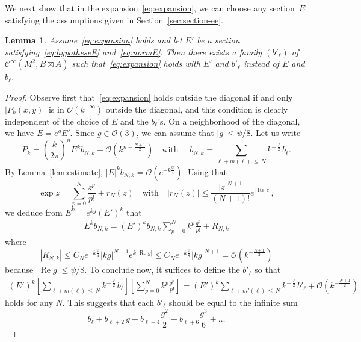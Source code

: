 \documentclass[10pt,a4paper]{article}
\newtheorem{lemm}[theo]{Lemma}
\theoremstyle{definition}
\numberwithin{equation}{section}
\newcommand{\con}{\overline}
\newcommand{\op}{\operatorname}
\newcommand{\Ci}{{\mathcal{C}}^{\infty}}
\newcommand{\bigo}{\mathcal{O}}
\begin{document}
We next show that in the expansion~\eqref{eq:expansion}, we can choose any section~$E$ satisfying the assumptions given in Section~\ref{sec:section-ee}.

\begin{lemm}\label{lem:changement_E}
Assume~\eqref{eq:expansion} holds and let $E'$ be a section satisfying~\eqref{eq:hypotheseE} and~\eqref{eq:normE}. Then there exists a family $(b'_{\ell})$ of $\Ci (M^2, B \boxtimes \con A)$ such that~\eqref{eq:expansion} holds with $E'$ and $b'_{\ell}$ instead of $E$ and $b_{\ell}$.
\end{lemm}

\begin{proof}
Observe first that~\eqref{eq:expansion} holds outside the diagonal if and only $|P_k (x,y)|$ is in $\bigo (k^{-\infty})$ outside the diagonal, and this condition is clearly independent of the choice of $E$ and the $b_{\ell}$'s. On a neighborhood of the diagonal, we have $E = e^{g} E'$. Since $g \in \bigo (3)$, we can assume that  $|g| \leqslant \psi/8$.  Let us write
\[
P_k = \left(\frac{k}{2 \pi}\right)^n E^k
b_{N,k} + \bigo \left(k^{n- \frac{N+1}{2}}\right) \quad \text{with } \quad b_{N,k} = \sum_{\ell + m (\ell)
\,\leqslant\,N} k^{-\frac{\ell}{2}}b_{\ell}.
\]
By Lemma~\ref{lem:estimate},  $|E|^k b_{N,k} = \bigo (e^{-k \frac{\psi}{4}})$.  Using that
\[
\exp z = \sum_{p = 0 }^N \frac{z^p }{p!} + r_N (z) \quad \text{with} \quad |r_{N} (z) | \leqslant \frac{|z|^{N+1} }{ (N+1)!} e^{|\op{Re} z |},
\]
we deduce from $E^k = e^{kg } (E')^k$ that
\begin{gather}\label{eq:fin}
E^k b_{N,k} = (E')^k b_{N,k} \sum_{p = 0 }^N k^p \frac{g^p}{p!} + R_{N,k}
\end{gather}
where 
\[
| R_{N,k} | \leqslant C_N e^{-k \frac{\psi}{4} } |kg|^{N+1} e^{ k
|\op{Re} g |} \leqslant C_N e^{-k \frac{\psi}{8} }
|kg|^{N+1} = \bigo \left(k^{- \frac{N+1}{2}}\right)
\]
because $|\op{Re} g | \leqslant \psi/8$.  To conclude now, it suffices to define the $b'_{\ell}$ so that
\begin{gather}\label{eq:last_goal}
(E')^k \left[\sum_{\ell + m (\ell)
\,\leqslant\,N} k^{-\frac{\ell}{2}}b_{\ell} \right] \left[\sum_{p = 0 }^N k^p \frac{g^p}{p!} \right]= (E')^k \sum_{\ell + m ' (\ell)\,\leqslant\,N} k^{- \frac{\ell}{2}} b'_{\ell} + \bigo \left(k^{-\frac{N+1}{2}}\right)
\end{gather}
holds for any $N$. This suggests that each $b'_{\ell}$ should be equal to the infinite sum
\[
b_{\ell}
+ b_{\ell +2 } \, g + b_{\ell +4 } \frac{g^2}{2} + b_{\ell+ 6} \frac{g^3}{6}
+\ldots
\]
\end{proof}
\end{document}
